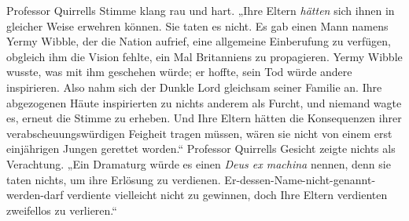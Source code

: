 Professor Quirrells Stimme klang rau und hart.
„Ihre Eltern \emph{hätten} sich ihnen in gleicher Weise erwehren können. Sie taten es nicht. Es gab einen Mann namens Yermy Wibble, der die Nation aufrief, eine allgemeine Einberufung zu verfügen, obgleich ihm die Vision fehlte, ein Mal Britanniens zu propagieren. Yermy Wibble wusste, was mit ihm geschehen würde; er hoffte, sein Tod würde andere inspirieren. Also nahm sich der Dunkle Lord gleichsam seiner Familie an. Ihre abgezogenen Häute inspirierten zu nichts anderem als Furcht, und niemand wagte es, erneut die Stimme zu erheben. Und Ihre Eltern hätten die Konsequenzen ihrer verabscheuungswürdigen Feigheit tragen müssen, wären sie nicht von einem erst einjährigen Jungen gerettet worden.“ Professor Quirrells Gesicht zeigte nichts als Verachtung.
„Ein Dramaturg würde es einen \emph{Deus ex machina} nennen, denn sie taten nichts, um ihre Erlösung zu verdienen. Er-dessen-Name-nicht-genannt-werden-darf verdiente vielleicht nicht zu gewinnen, doch Ihre Eltern verdienten zweifellos zu verlieren.“

